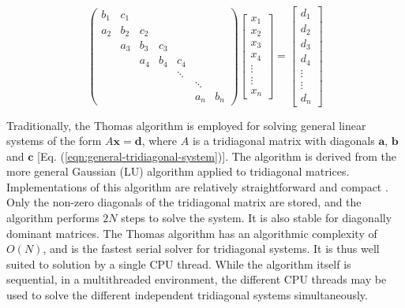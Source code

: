 \begin{equation} \label{eqn:general-tridiagonal-system}
\begin{pmatrix}
     b_1 & c_1  \\
     a_2 & b_2  &  c_2  \\
         & a_3  &  b_3 &  c_3  \\
         &      &  a_4 &  b_4 &  c_4  \\
         &      &      &      &  \ddots \\
         &      &      &      &     &  \ddots  \\
         &      &      &      &     &  a_n  &  b_n
\end{pmatrix}
\begin{bmatrix}
    x_1 \\
    x_2 \\
    x_3 \\
    x_4 \\
    \vdots \\
    \vdots \\
    x_n
 \end{bmatrix}
=
\begin{bmatrix}
   d_1 \\
   d_2 \\
   d_3 \\
   d_4 \\
   \vdots \\
   \vdots \\
   d_{n}
\end{bmatrix}
\end{equation}

Traditionally,
the Thomas algorithm is employed for solving
general linear systems of the form $A\bm{x} = \bm{d}$,
where $A$ is a tridiagonal matrix with diagonals
$\bm{a}$, $\bm{b}$ and $\bm{c}$
[Eq. (\ref{eqn:general-tridiagonal-system})].
The algorithm is derived
from the more general Gaussian (LU) algorithm
applied to tridiagonal matrices.
Implementations of this algorithm are relatively straightforward
and compact \cite{numericalrecipes}.
Only the non-zero diagonals of the tridiagonal matrix
are stored,
and the algorithm performs $2N$ steps
to solve the system.
It is also stable for diagonally dominant matrices.
The Thomas algorithm has an algorithmic complexity of $O(N)$,
and is the fastest serial solver for tridiagonal systems.
It is thus well suited to solution by a single CPU thread.
While the algorithm itself is sequential,
in a multithreaded environment,
the different CPU threads may be used to solve
the different independent tridiagonal systems simultaneously.

